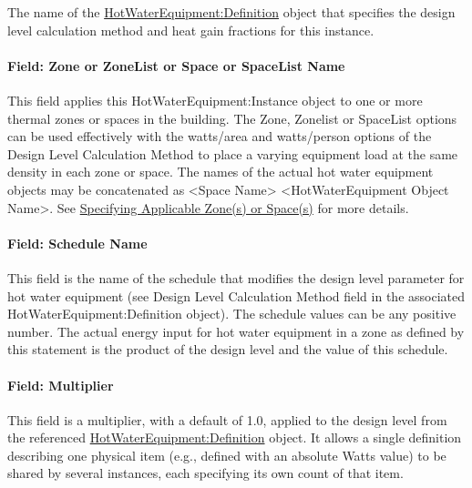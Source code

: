 The name of the \hyperref[hotwaterequipmentdefinition]{HotWaterEquipment:Definition} object that specifies the design level calculation method and heat gain fractions for this instance.

\paragraph{Field: Zone or ZoneList or Space or SpaceList Name}\label{hweq-field-zone-or-zonelist-name-000-hw-instance}

This field applies this HotWaterEquipment:Instance object to one or more thermal zones or spaces in the building. The Zone, Zonelist or SpaceList options can be used effectively with the watts/area and watts/person options of the Design Level Calculation Method to place a varying equipment load at the same density in each zone or space. The names of the actual hot water equipment objects may be concatenated as \textless{}Space Name\textgreater{} \textless{}HotWaterEquipment Object Name\textgreater{}. See \hyperref[specifying-applicable-zones-or-spaces]{Specifying Applicable Zone(s) or Space(s)} for more details.

\paragraph{Field: Schedule Name}\label{field-schedule-name-3-000-hw-instance}

This field is the name of the schedule that modifies the design level parameter for hot water equipment (see Design Level Calculation Method field in the associated HotWaterEquipment:Definition object). The schedule values can be any positive number. The actual energy input for hot water equipment in a zone as defined by this statement is the product of the design level and the value of this schedule.

\paragraph{Field: Multiplier}\label{field-multiplier-hotwaterequipmentinstance}

This field is a multiplier, with a default of 1.0, applied to the design level from the referenced \hyperref[hotwaterequipmentdefinition]{HotWaterEquipment:Definition} object. It allows a single definition describing one physical item (e.g., defined with an absolute Watts value) to be shared by several instances, each specifying its own count of that item.

